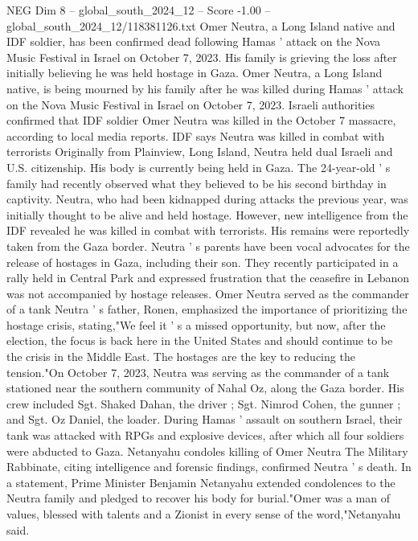 \begin{textsample}{NEG Dim 8 – global\_south\_2024\_12 – Score -1.00 – global\_south\_2024\_12/118381126.txt}  \label{ex:f8_neg_383}
Omer Neutra, a Long Island native and IDF soldier, has been confirmed dead following Hamas ' attack on the Nova Music Festival in Israel on October 7, 2023.
His family is grieving the loss after initially believing he was held hostage in Gaza.
Omer Neutra, a Long Island native, is being mourned by his family after he was killed during Hamas ' attack on the Nova Music Festival in Israel on October 7, 2023.
Israeli authorities confirmed that IDF soldier Omer Neutra was killed in the October 7 massacre, according to local media reports.
IDF says Neutra was killed in combat with terrorists Originally from Plainview, Long Island, Neutra held dual Israeli and U.S. citizenship.
His body is currently being held in Gaza.
The 24-year-old ' s family had recently observed what they believed to be his second birthday in captivity.
Neutra, who had been kidnapped during attacks the previous year, was initially thought to be alive and held hostage.
However, new intelligence from the IDF revealed he was killed in combat with terrorists.
His remains were reportedly taken from the Gaza border.
Neutra ' s parents have been vocal advocates for the release of hostages in Gaza, including their son.
They recently participated in a rally held in Central Park and expressed frustration that the ceasefire in Lebanon was not accompanied by hostage releases.
Omer Neutra served as the commander of a tank Neutra ' s father, Ronen, emphasized the importance of prioritizing the hostage crisis, stating,"We feel it ' s a missed opportunity, but now, after the election, the focus is back here in the United States and should continue to be the crisis in the Middle East.
The hostages are the key to reducing the tension."On October 7, 2023, Neutra was serving as the commander of a tank stationed near the southern community of Nahal Oz, along the Gaza border.
His crew included Sgt.
Shaked Dahan, the driver ; Sgt.
Nimrod Cohen, the gunner ; and Sgt.
Oz Daniel, the loader.
During Hamas ' assault on southern Israel, their tank was attacked with RPGs and explosive devices, after which all four soldiers were abducted to Gaza.
Netanyahu condoles killing of Omer Neutra The Military Rabbinate, citing intelligence and forensic findings, confirmed Neutra ' s death.
In a statement, Prime Minister Benjamin Netanyahu extended condolences to the Neutra family and pledged to recover his body for burial."Omer was a man of values, blessed with talents and a Zionist in every sense of the word,"Netanyahu said.

\end{textsample}
